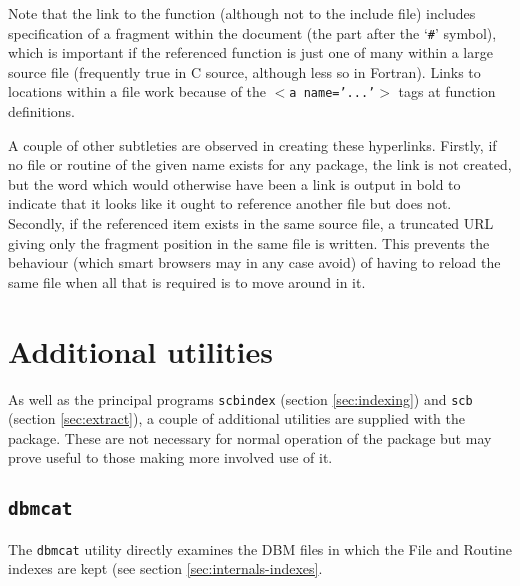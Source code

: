 \documentclass[twoside,11pt]{article}
\newcommand{\xlabel}[1]{}
\renewcommand{\_}{\texttt{\symbol{95}}}
\begin{document}
Note that the link to the function (although not to the include file)
includes specification of a fragment within the document
(the part after the `{\tt \#}' symbol), 
which is important if the referenced function is just one of many within a
large source file (frequently true in C source, although less so in Fortran).
Links to locations within a file work because of the
{\tt $<$a~name='...'$>$} tags at function definitions.

A couple of other subtleties are observed in creating these hyperlinks.
Firstly, if no file or routine of the given name exists for any package,
the link is not created, but the word which would otherwise have
been a link is output in bold to indicate that it looks
like it ought to reference another file but does not.
Secondly, if the referenced item exists in the same source file,
a truncated URL giving only the fragment position in the same
file is written.  This prevents the behaviour (which smart browsers
may in any case avoid) of having to reload the same file when all
that is required is to move around in it.


\section{\xlabel{sec:utilities}\label{sec:utilities}Additional utilities}

As well as the principal programs
{\tt scbindex} (section \ref{sec:indexing})
and 
{\tt scb} (section \ref{sec:extract}),
a couple of additional utilities are supplied with the package.
These are not necessary for normal operation 
of the package but may prove useful to those making more 
involved use of it.




\subsection{\xlabel{sec:dbmcat}\label{sec:dbmcat}{\tt dbmcat}}

The {\tt dbmcat} utility directly examines the DBM files 
in which the File and Routine indexes are kept 
(see section \ref{sec:internals-indexes}.
\end{document}
